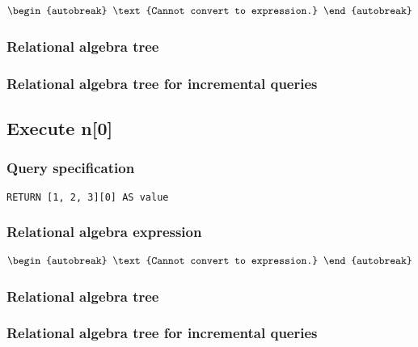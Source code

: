 \begin{align*}
\begin{autobreak}
\text{Cannot convert to expression.}
\end{autobreak}
\end{align*}

\subsubsection*{Relational algebra tree}


\subsubsection*{Relational algebra tree for incremental queries}


\subsection{Execute n[0]}

\subsubsection*{Query specification}

\begin{lstlisting}
RETURN [1, 2, 3][0] AS value
\end{lstlisting}

\subsubsection*{Relational algebra expression}

\begin{align*}
\begin{autobreak}
\text{Cannot convert to expression.}
\end{autobreak}
\end{align*}

\subsubsection*{Relational algebra tree}


\subsubsection*{Relational algebra tree for incremental queries}

